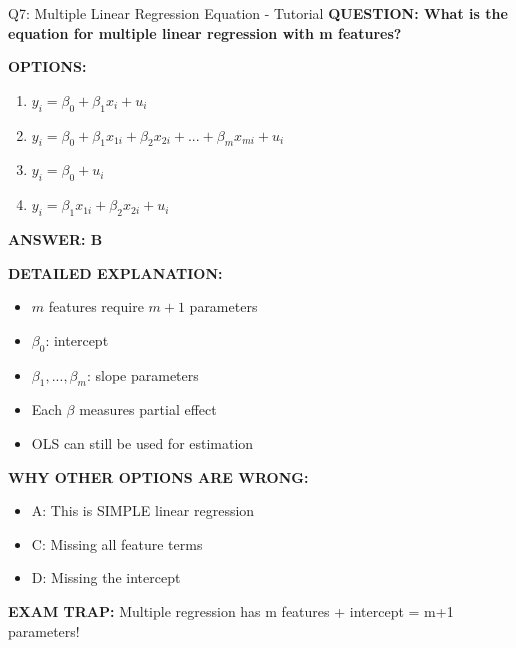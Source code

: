 \documentclass[8pt]{beamer}
\begin{document}
	\begin{frame}{Q7: Multiple Linear Regression Equation - Tutorial}
		\fontsize{6.5}{7.5}\selectfont
		\textbf{QUESTION: What is the equation for multiple linear regression with m features?}
		
		\vspace{0.1cm}
		\textbf{OPTIONS:}
		\begin{enumerate}
			\item $y_i = \beta_0 + \beta_1 x_i + u_i$
			\item $y_i = \beta_0 + \beta_1 x_{1i} + \beta_2 x_{2i} + ... + \beta_m x_{mi} + u_i$
			\item $y_i = \beta_0 + u_i$
			\item $y_i = \beta_1 x_{1i} + \beta_2 x_{2i} + u_i$
		\end{enumerate}
		
		\vspace{0.1cm}
		\textcolor{myblue}{\textbf{ANSWER: B}}
		
		\vspace{0.1cm}
		\textbf{DETAILED EXPLANATION:}
		\begin{itemize}
			\item $m$ features require $m+1$ parameters
			\item $\beta_0$: intercept
			\item $\beta_1, ..., \beta_m$: slope parameters
			\item Each $\beta$ measures partial effect
			\item OLS can still be used for estimation
		\end{itemize}
		
		\vspace{0.1cm}
		\textcolor{myred}{\textbf{WHY OTHER OPTIONS ARE WRONG:}}
		\begin{itemize}
			\item \textcolor{myred}{A:} This is SIMPLE linear regression
			\item \textcolor{myred}{C:} Missing all feature terms
			\item \textcolor{myred}{D:} Missing the intercept
		\end{itemize}
		
		\textcolor{myred}{\textbf{EXAM TRAP:}} Multiple regression has \textcolor{myblue}{m features + intercept} = m+1 parameters!
	\end{frame}
	
\end{document}
